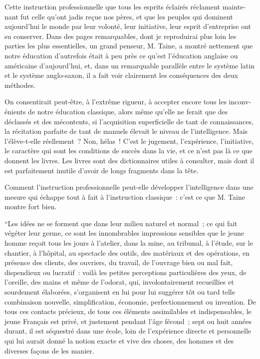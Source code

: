 \documentclass[french,twoside]{book} %
\begin{document}
Cette instruction professionnelle que tous les esprits éclairés réclament mainte­nant fut celle qu’ont jadis reçue nos pères, et que les peuples qui dominent aujourd’hui le monde par leur volonté, leur initiative, leur esprit d’entreprise ont su conserver. Dans des pages remarquables, dont je reproduirai plus loin les parties les plus essen­tielles, un grand penseur, M. Taine, a montré nettement que notre éducation d’autre­fois était à peu près ce qu’est l’éducation anglaise ou américaine d’aujourd’hui, et, dans un remarquable parallèle entre le système latin et le système anglo-saxon, il a fait voir clairement les conséquences des deux méthodes.\par
On consentirait peut-être, à l’extrême rigueur, à accepter encore tous les inconv­énients de notre éducation classique, alors même qu’elle ne ferait que des déclassés et des mécontents, si l’acquisition superficielle de tant de connaissances, la récitation parfaite de tant de manuels élevait le niveau de l’intelligence. Mais l’élève-t-elle réel­lement ? Non, hélas ! C’est le jugement, l’expérience, l’initiative, le caractère qui sont les conditions de succès dans la vie, et ce n’est pas là ce que donnent les livres. Les livres sont des dictionnaires utiles à consulter, mais dont il est parfaitement inutile d’avoir de longs fragments dans la tête.\par
Comment l’instruction professionnelle peut-elle développer l’intelligence dans une mesure qui échappe tout à fait à l’instruction classique : c’est ce que M. Taine montre fort bien.\par
“Les idées ne se forment que dans leur milieu naturel et normal ; ce qui fait végéter leur germe, ce sont les innombrables impressions sensibles que le jeune hom­me reçoit tous les jours à l’atelier, dans la mine, au tribunal, à l’étude, sur le chantier, à l’hôpital, au spectacle des outils, des matériaux et des opérations, en présence des clients, des ouvriers, du travail, de l’ouvrage bien ou mal fait, dispendieux ou lucratif : voilà les petites perceptions particulières des yeux, de l’oreille, des mains et même de l’odorat, qui, involontairement recueillies et sourdement élaborées, s’organisent en lui pour lui suggérer tôt ou tard telle combinaison nouvelle, simplification, économie, perfectionnement ou invention. De tous ces contacts précieux, de tous ces éléments assimilables et indispensables, le jeune Français est privé, et justement pendant l’âge fécond ; sept ou huit années durant, il est séquestré dans une école, loin de l’expé­rience directe et personnelle qui lui aurait donné la notion exacte et vive des choses, des hommes et des diverses façons de les manier.\par
\end{document}
